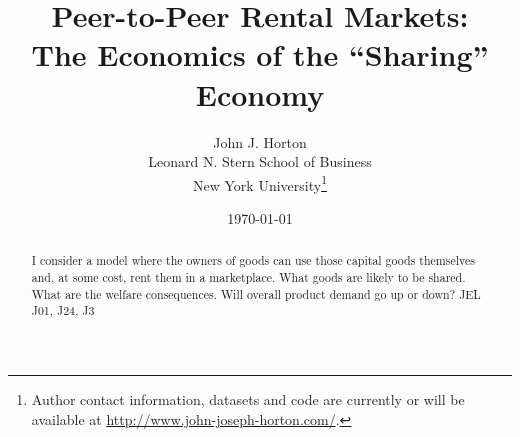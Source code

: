 \documentclass[11pt]{article}
\begin{document}
 

\newtheorem{prop}{Proposition}


\title{Peer-to-Peer Rental Markets: \\ The Economics of the ``Sharing'' Economy} 

\date{\today}

\author{John J. Horton \\ Leonard N. Stern School of Business \\ New York University\footnote{ Author contact information, datasets and code are currently or will be available at \href{http://www.john-joseph-horton.com/}{http://www.john-joseph-horton.com/}. } }
\maketitle

\begin{abstract}
\noindent  I consider a model where the owners of goods can use those capital goods themselves and, at some cost, rent them in a marketplace. 
What goods are likely to be shared. 
What are the welfare consequences. 
Will overall product demand go up or down? \newline
\noindent JEL J01, J24, J3
\end{abstract} 


\end{document}
